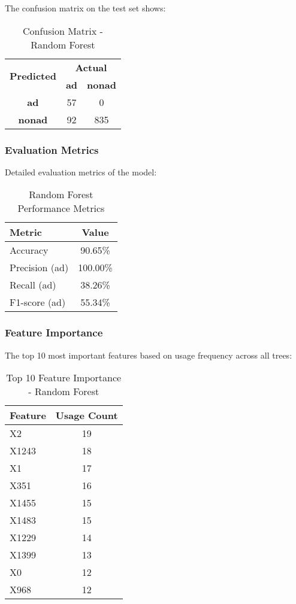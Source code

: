 The confusion matrix on the test set shows:

\begin{table}[h]
\centering
\caption{Confusion Matrix - Random Forest}
\begin{tabular}{|c|c|c|}
\hline
\multirow{2}{*}{\textbf{Predicted}} & \multicolumn{2}{c|}{\textbf{Actual}} \\
\cline{2-3}
 & \textbf{ad} & \textbf{nonad} \\
\hline
\textbf{ad} & 57 & 0 \\
\hline
\textbf{nonad} & 92 & 835 \\
\hline
\end{tabular}
\end{table}

\subsubsection{Evaluation Metrics}

Detailed evaluation metrics of the model:

\begin{table}[h]
\centering
\caption{Random Forest Performance Metrics}
\begin{tabular}{|l|c|}
\hline
\textbf{Metric} & \textbf{Value} \\
\hline
Accuracy & 90.65\% \\
Precision (ad) & 100.00\% \\
Recall (ad) & 38.26\% \\
F1-score (ad) & 55.34\% \\
\hline
\end{tabular}
\end{table}

\subsubsection{Feature Importance}

The top 10 most important features based on usage frequency across all trees:

\begin{table}[h]
\centering
\caption{Top 10 Feature Importance - Random Forest}
\begin{tabular}{|l|c|}
\hline
\textbf{Feature} & \textbf{Usage Count} \\
\hline
X2 & 19 \\
X1243 & 18 \\
X1 & 17 \\
X351 & 16 \\
X1455 & 15 \\
X1483 & 15 \\
X1229 & 14 \\
X1399 & 13 \\
X0 & 12 \\
X968 & 12 \\
\hline
\end{tabular}
\end{table}

